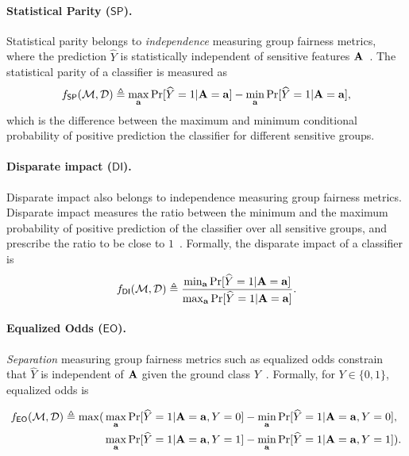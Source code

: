 \paragraph{Statistical Parity ($ \mathsf{SP} $).} Statistical parity belongs to \textit{independence} measuring group fairness metrics, where the prediction $ \widehat{Y} $ is statistically independent of sensitive features $ \mathbf{A} $~\cite{feldman2015certifying}.  The statistical parity of  a classifier is measured as 
\[ f_{\mathsf{SP}}(\mathcal{M}, \mathcal{D}) \triangleq \max_{\mathbf{a}}\Pr[\widehat{Y} =1 | \mathbf{A} = \mathbf{a}] - \min_{\mathbf{a}}\Pr[\widehat{Y} =1 | \mathbf{A} = \mathbf{a}], \] which is the difference between the maximum and minimum conditional probability of positive prediction the classifier for different sensitive groups.


\paragraph{Disparate impact ($ \mathsf{DI} $).} Disparate impact also belongs to independence measuring group fairness metrics. Disparate impact measures the ratio between the minimum and the maximum probability of positive prediction of the classifier over all sensitive groups, and prescribe the ratio to be close to $1$~\cite{feldman2015certifying}.  Formally, the disparate impact of a classifier is 
\[
f_{\mathsf{DI}}(\mathcal{M}, \mathcal{D}) \triangleq \frac{\min_{\mathbf{a}} \Pr[\widehat{Y} =1 | \mathbf{A} =  \mathbf{a}]}{\max_{\mathbf{a}} \Pr[\widehat{Y} =1 | \mathbf{A} =  \mathbf{a}]}.
\]



\paragraph{Equalized Odds ($ \mathsf{EO} $).} \textit{Separation} measuring group fairness metrics such as equalized odds constrain that $ \widehat{Y} $ is independent of $ \mathbf{A} $ given the ground class $ Y $~\cite{hardt2016equality}.  Formally, for $ Y \in \{0,1\} $, equalized odds is 

\begin{align*}
	f_{\mathsf{EO}}(\mathcal{M}, \mathcal{D})  \triangleq \max(&\max_{\mathbf{a}}\Pr[\widehat{Y} =1 | \mathbf{A} = \mathbf{a}, Y = 0] - \min_{\mathbf{a}}\Pr[\widehat{Y} =1 | \mathbf{A} = \mathbf{a}, Y = 0], \\ &\max_{\mathbf{a}}\Pr[\widehat{Y} =1 | \mathbf{A} = \mathbf{a}, Y = 1] - \min_{\mathbf{a}}\Pr[\widehat{Y} =1 | \mathbf{A} = \mathbf{a}, Y = 1]).
\end{align*} 


